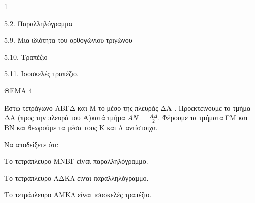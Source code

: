 \begin{ylh}{1}
    \item 5.2. Παραλληλόγραμμα
    \item 5.9. Μια ιδιότητα του ορθογώνιου τριγώνου
    \item 5.10. Τραπέζιο
    \item 5.11. Ισοσκελές τραπέζιο.
\end{ylh}

ΘΕΜΑ 4

Έστω τετράγωνο ΑΒΓΔ και Μ το μέσο της πλευράς ΔΑ . Προεκτείνουμε το τμήμα ΔΑ (προς την πλευρά του Α)κατά τμήμα $ΑΝ = \ \frac{Α\Delta}{2}$. Φέρουμε τα τμήματα ΓΜ και ΒΝ και θεωρούμε τα μέσα τους Κ και Λ αντίστοιχα.

Να αποδείξετε ότι:

\begin{alist}
\item Το τετράπλευρο ΜΝΒΓ είναι παραλληλόγραμμο. 

\item Το τετράπλευρο ΑΔΚΛ είναι παραλληλόγραμμο. 

\item Το τετράπλευρο ΑΜΚΛ είναι ισοσκελές τραπέζιο. 


\end{alist}
